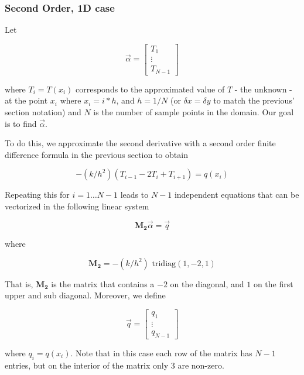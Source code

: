 \subsubsection{Second Order, 1D case}
Let 

\begin{equation*}
\Vec{\alpha} = 
     \begin{bmatrix}
        T_1 \\
        \vdots \\
        T_{N-1} 
    \end{bmatrix}  
\end{equation*}

where $T_i = T(x_i)$ corresponds to the approximated value of $T$ - the unknown - at the point $x_i$ where $x_i = i*h$, and $h = 1/N$ (or $\delta x = \delta y$ to match the previous' section notation) and $N$ is the number of sample points in the domain. Our goal is to find $\Vec{\alpha}$.

To do this, we approximate the second derivative with a second order finite difference formula in the previous section to obtain

\begin{equation*}
-(k/h^2) (T_{i-1} -2 T_i + T_{i+1}) = q(x_i)
\end{equation*}

Repeating this for $i = 1 \ldots N-1$ leads to $N-1$ independent equations that can be vectorized in the following linear system

\begin{equation*}
\mathbf{M_2} \Vec{\alpha} = \Vec{q}
\end{equation*}

where 

\begin{equation*}
    \mathbf{M_2}  = -(k/h^2)\text{ tridiag}(1, -2 , 1)
\end{equation*}

That is, $\mathbf{M_2}$ is the matrix that contains a $-2$ on the diagonal, and $1$ on the first upper and sub diagonal. Moreover, we define

\begin{equation*}
\Vec{q} = 
     \begin{bmatrix}
        q_1 \\
        \vdots \\
        q_{N-1}
    \end{bmatrix}  
\end{equation*}

where $q_i = q(x_i)$. Note that in this case each row of the matrix has $N-1$ entries, but on the interior of the matrix only $3$ are non-zero.

